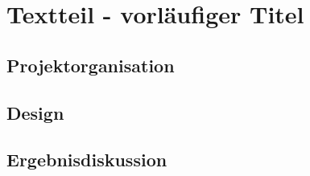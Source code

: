 \section{Textteil - vorläufiger Titel} \label{Textteil}





\subsection{Projektorganisation}

\subsection{Design}

\subsection{Ergebnisdiskussion}